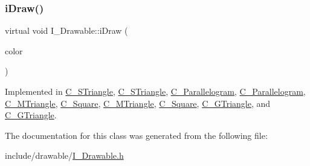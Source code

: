 \mbox{\label{classI__Drawable_a25f6474325614c451a91f019e5fe8010}} 
\subsubsection{\texorpdfstring{i\+Draw()}{iDraw()}\hspace{0.1cm}{\footnotesize\ttfamily [4/4]}}
{\footnotesize\ttfamily virtual void I\+\_\+\+Drawable\+::i\+Draw (\begin{DoxyParamCaption}\item[{M\+L\+V\+\_\+\+Color}]{color }\end{DoxyParamCaption})\hspace{0.3cm}{\ttfamily [pure virtual]}}



Implemented in \hyperlink{classC__STriangle_ad003b932a467de60b814d897fda38390}{C\+\_\+\+S\+Triangle}, \hyperlink{classC__STriangle_ad003b932a467de60b814d897fda38390}{C\+\_\+\+S\+Triangle}, \hyperlink{classC__Parallelogram_a044ce6d1042ea93589a38f4686489862}{C\+\_\+\+Parallelogram}, \hyperlink{classC__Parallelogram_a044ce6d1042ea93589a38f4686489862}{C\+\_\+\+Parallelogram}, \hyperlink{classC__MTriangle_a049e6026145865387db4244678336784}{C\+\_\+\+M\+Triangle}, \hyperlink{classC__Square_a47a80c25bbeda17f17a8230127b4a5ed}{C\+\_\+\+Square}, \hyperlink{classC__MTriangle_a049e6026145865387db4244678336784}{C\+\_\+\+M\+Triangle}, \hyperlink{classC__Square_a47a80c25bbeda17f17a8230127b4a5ed}{C\+\_\+\+Square}, \hyperlink{classC__GTriangle_a9cfd20cb1d19e6c92bd217c470c86405}{C\+\_\+\+G\+Triangle}, and \hyperlink{classC__GTriangle_a9cfd20cb1d19e6c92bd217c470c86405}{C\+\_\+\+G\+Triangle}.



The documentation for this class was generated from the following file\+:\begin{DoxyCompactItemize}
\item 
include/drawable/\hyperlink{drawable_2I__Drawable_8h}{I\+\_\+\+Drawable.\+h}\end{DoxyCompactItemize}
